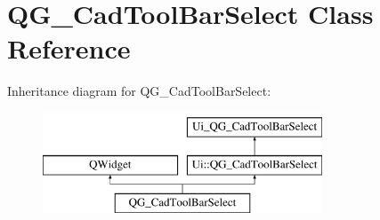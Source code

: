 \hypertarget{classQG__CadToolBarSelect}{\section{Q\-G\-\_\-\-Cad\-Tool\-Bar\-Select Class Reference}
\label{classQG__CadToolBarSelect}
}
Inheritance diagram for Q\-G\-\_\-\-Cad\-Tool\-Bar\-Select\-:\begin{figure}[H]
\begin{center}
\leavevmode
\includegraphics[height=3.000000cm]{classQG__CadToolBarSelect}
\end{center}
\end{figure}
